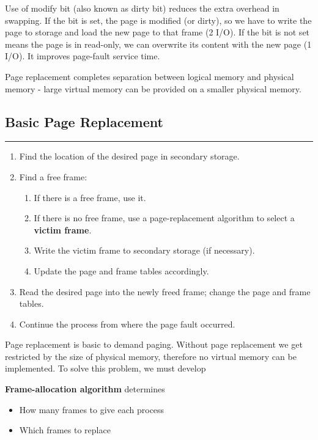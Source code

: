 \documentclass[12pt,onecolumn]{IEEEtran}
\begin{document}
Use of modify bit (also known as dirty bit) reduces the extra overhead in swapping. 
If the bit is set, the page is modified (or dirty), so we have to write the page to storage and 
load the new page to that frame (2 I/O). If the bit is not set means the page is in read-only, 
we can overwrite its content with the new page (1 I/O). It improves page-fault service time.
\vspace{3mm}

Page replacement completes separation between logical
memory and physical memory - large virtual memory can
be provided on a smaller physical memory.
\subsection{Basic Page Replacement}
\hrule
\vspace{3mm}
\begin{enumerate}
	\item Find the location of the desired page in secondary storage.
	\item Find a free frame:
	\begin{enumerate}
		\item If there is a free frame, use it.
		\item If there is no free frame, use a page-replacement algorithm to select
		a \textbf{victim frame}.
		\item Write the victim frame to secondary storage (if necessary).
		\item Update the page and frame tables accordingly.
	\end{enumerate}
	\item Read the desired page into the newly freed frame; change the page and
	frame tables.
	\item Continue the process from where the page fault occurred.
\end{enumerate}
Page replacement is basic to demand paging. Without page replacement we get restricted by the 
size of physical memory, therefore no virtual memory can be implemented. To solve this problem, 
we must develop 

\textbf{Frame-allocation algorithm} determines
\begin{itemize}
	\item How many frames to give each process
	\item Which frames to replace
\end{itemize}
\end{document}
